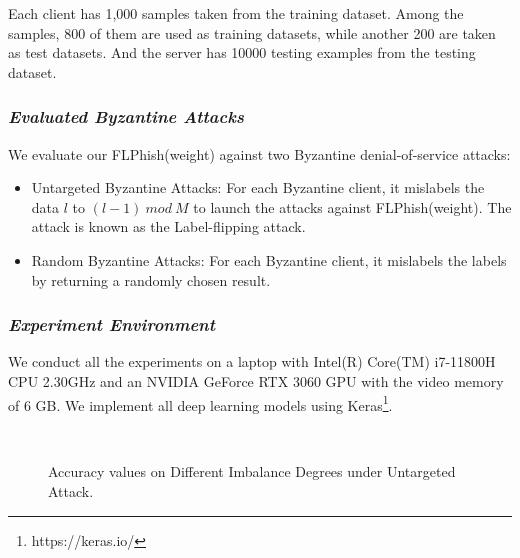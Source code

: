 \documentclass[lettersize,journal]{IEEEtran}
\begin{document}
  \par Each client has 1,000 samples taken from the training dataset. Among the samples, 800 of them are used as training datasets, while another 200 are taken as test datasets. And the server has 10000 testing examples from the testing dataset. 
  \subsubsection{\textit{Evaluated Byzantine Attacks}} We evaluate our FLPhish(weight) against two Byzantine denial-of-service attacks:
  \begin{itemize}
    \item Untargeted Byzantine Attacks: For each Byzantine client, it mislabels the data $l$ to $(l-1)\ mod\ M$ to launch the attacks against FLPhish(weight). The attack is known as the Label-flipping attack. 
    \item Random Byzantine Attacks: For each Byzantine client, it mislabels the labels by returning a randomly chosen result.
    \end{itemize}

  
  \subsubsection{{\textit{Experiment Environment}}} We conduct all the experiments on a laptop with Intel(R) Core(TM) i7-11800H CPU 2.30GHz and an NVIDIA GeForce RTX 3060 GPU with the video memory of 6 GB. We implement all deep learning models using Keras\footnote{https://keras.io/}.



  \begin{figure}[!htp]
    \centering
    \\
    \caption{Accuracy values on Different Imbalance Degrees under Untargeted Attack.}
    \label{fig_table_imbalances_untargeted}
  \end{figure}
\end{document}
